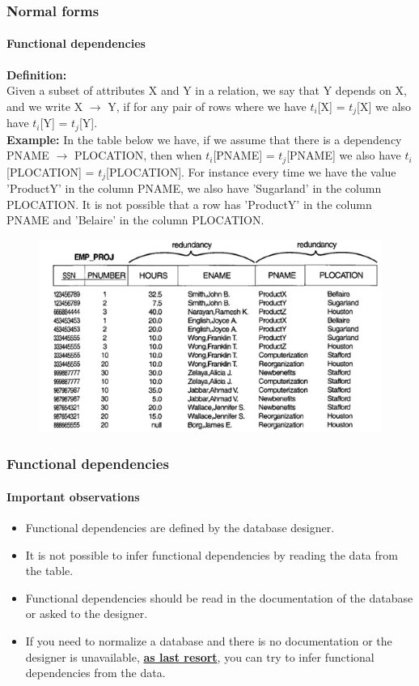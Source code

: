 \documentclass{beamer}
\newcommand{\tuple}[2]{$t_{#1}$[#2]}
\newcommand{\fdep}[2]{#1 $\rightarrow$ #2}
\begin{document}
\begin{frame}
	\frametitle{Normal forms}
	\framesubtitle{Functional dependencies}
	\textbf{Definition:}\\
	Given a subset of attributes X and Y in a relation, we say that Y depends on X, and we write \fdep{X}{Y}, if for any pair of rows where we have \tuple{i}{X} = \tuple{j}{X} we also have \tuple{i}{Y} = \tuple{j}{Y}.\\
\pause
	\tiny
	\textbf{Example: } In the table below we have, if we assume that there is a dependency \fdep{PNAME}{PLOCATION}, then when \tuple{i}{PNAME} = \tuple{j}{PNAME} we also have \tuple{i}{PLOCATION} = \tuple{j}{PLOCATION}. For instance every time we have the value 'ProductY' in the column PNAME, we also have 'Sugarland' in the column PLOCATION. It is not possible that a row has 'ProductY' in the column PNAME and 'Belaire' in the column PLOCATION.
	
	\begin{figure}
		\includegraphics[scale=0.4]{img/normalization/norm6}
	\end{figure}
\end{frame}

\begin{frame}
	\frametitle{Functional dependencies}
	\framesubtitle{Important observations}
	
	\begin{itemize}
		\item Functional dependencies are defined by the database designer.
		\item It is not possible to infer functional dependencies by reading the data from the table.
		\item Functional dependencies should be read in the documentation of the database or asked to the designer.
		\item If you need to normalize a database and there is no documentation or the designer is unavailable, \textbf{\underline{as last resort}}, you can try to infer functional dependencies from the data.		
	\end{itemize}
\end{frame}
\end{document}

